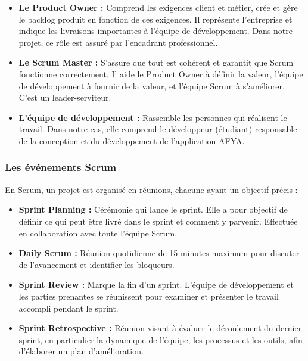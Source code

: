 \begin{itemize}
    \item \textbf{Le Product Owner :} Comprend les exigences client et métier, crée et gère le backlog produit en fonction de ces exigences. Il représente l'entreprise et indique les livraisons importantes à l'équipe de développement. Dans notre projet, ce rôle est assuré par l'encadrant professionnel.

    \item \textbf{Le Scrum Master :} S'assure que tout est cohérent et garantit que Scrum fonctionne correctement. Il aide le Product Owner à définir la valeur, l'équipe de développement à fournir de la valeur, et l'équipe Scrum à s'améliorer. C'est un leader-serviteur.

    \item \textbf{L'équipe de développement :} Rassemble les personnes qui réalisent le travail. Dans notre cas, elle comprend le développeur (étudiant) responsable de la conception et du développement de l'application AFYA.
\end{itemize}

\subsubsection{Les événements Scrum}
En Scrum, un projet est organisé en réunions, chacune ayant un objectif précis :

\begin{itemize}
    \item \textbf{Sprint Planning :} Cérémonie qui lance le sprint. Elle a pour objectif de définir ce qui peut être livré dans le sprint et comment y parvenir. Effectuée en collaboration avec toute l'équipe Scrum.

    \item \textbf{Daily Scrum :} Réunion quotidienne de 15 minutes maximum pour discuter de l'avancement et identifier les bloqueurs.

    \item \textbf{Sprint Review :} Marque la fin d'un sprint. L'équipe de développement et les parties prenantes se réunissent pour examiner et présenter le travail accompli pendant le sprint.

    \item \textbf{Sprint Retrospective :} Réunion visant à évaluer le déroulement du dernier sprint, en particulier la dynamique de l'équipe, les processus et les outils, afin d'élaborer un plan d'amélioration.
\end{itemize}

